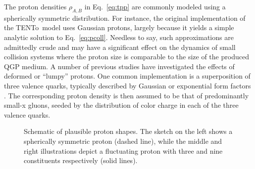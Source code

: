 \documentclass[aps,prc,reprint,amsmath,nofootinbib]{revtex4-1}
\newcommand{\trento}{T\raisebox{-0.5ex}{R}ENTo}
\begin{document}
The proton densities $\rho_{A,B}$ in Eq.~\eqref{eq:tpp} are commonly modeled using a spherically symmetric distribution.
For instance, the original implementation of the \trento\ model uses Gaussian protons, largely because it yields a simple analytic solution to Eq.~\eqref{eq:pcoll}.
Needless to say, such approximations are admittedly crude and may have a significant effect on the dynamics of small collision systems where the proton size is comparable to the size of the produced QGP medium.
A number of previous studies have investigated the effects of deformed or ``lumpy'' protons.
One common implementation is a superposition of three valence quarks, typically described by Gaussian or exponential form factors \cite{Welsh:2016siu, Bozek:2017jog, Schenke:2014zha, Schlichting:2014ipa, Adare:2015bua, Broniowski:2016pvx}.
The corresponding proton density is then assumed to be that of predominantly small-x gluons, seeded by the distribution of color charge in each of the three valence quarks.

\begin{figure}
  \caption{Schematic of plausible proton shapes. The sketch on the left shows a spherically symmetric proton (dashed line), while the middle and right illustrations depict a fluctuating proton with three and nine constituents respectively (solid lines).}
  \label{fig:substructure}
\end{figure}
\end{document}
